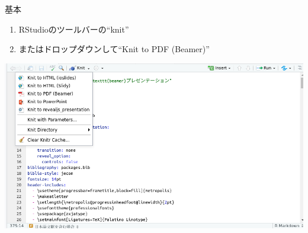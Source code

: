 \documentclass[
  12pt,
  ignorenonframetext,
]{beamer}
\providecommand{\tightlist}{%
  \setlength{\itemsep}{0pt}\setlength{\parskip}{0pt}}
\begin{document}
\begin{frame}{基本}
\protect\hypertarget{ux57faux672c}{}

\begin{enumerate}
\tightlist
\item
  RStudioのツールバーの``knit''
\item
  またはドロップダウンして``Knit to PDF (Beamer)''
\end{enumerate}

\begin{center}\includegraphics[width=0.9\linewidth]{img/render} \end{center}

\end{frame}
\end{document}
